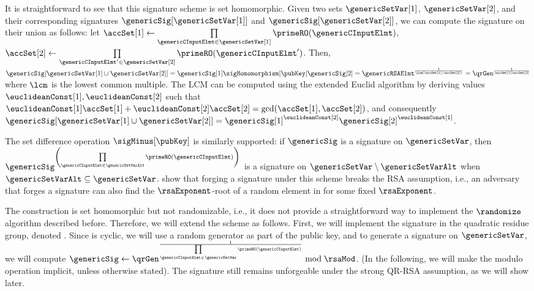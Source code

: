 It is straightforward to see that this signature 
scheme is set homomorphic. Given two sets $\genericSetVar[1]$, $\genericSetVar[2]$, and their 
corresponding signatures 
$\genericSig[\genericSetVar[1]]$ 
and $\genericSig[\genericSetVar[2]]$, we can compute the signature on their union as follows: let 
$\accSet[1] \gets 
\prod\limits_{\genericCInputElmt \in \genericSetVar[1]} \primeRO(\genericCInputElmt)$, $\accSet[2] \gets 
\prod\limits_{\genericCInputElmt' \in \genericSetVar[2]}  \primeRO(\genericCInputElmt')$. Then,  
$\genericSig[\genericSetVar[1] \cup \genericSetVar[2]] = \genericSig[1] 
\sigHomomorphism[\pubKey] \genericSig[2] = \genericRSAElmt^{\frac{1}{\lcm(\accSet[1],\accSet[2])}} 
= \qrGen^{\frac{1}{\accSet[1] \accSet[2]}}$ where $\lcm$ is the lowest common 
multiple. The LCM can be computed using the extended Euclid algorithm 
by deriving values $\euclideanConst[1], \euclideanConst[2]$ such that  
	$\euclideanConst[1]\accSet[1] + \euclideanConst[2] \accSet[2] = \gcd(\accSet[1], \accSet[2])$, and 
	consequently $\genericSig[\genericSetVar[1] \cup \genericSetVar[2]]  = 
	\genericSig[1]^{\euclideanConst[2]}  \genericSig[2]^{\euclideanConst[1]}$. 
	
	
	The set difference operation $\sigMinus[\pubKey]$ is similarly supported: 
	if $\genericSig$ is a signature on $\genericSetVar$, then 
	$\genericSig^{\left(\prod\limits_{\genericCInputElmt \in \genericSetVarAlt} 
	\primeRO(\genericCInputElmt)\right)}$ is a signature on $\genericSetVar \setminus 
		\genericSetVarAlt$ when $\genericSetVarAlt \subseteq \genericSetVar$. 
	\citet{johnson2002homomorphic} show that forging a signature 
	under this scheme breaks the RSA assumption, i.e., an adversary that forges a signature 
	can also find the $\rsaExponent$-root of a random element in \integersModNInv for some fixed 
	$\rsaExponent$. 
       \fi 
        

\newcommand{\equivClass}[2]{\ensuremath{\left\lbrack#1\right\rbrack_{#2}}\xspace}

\iffalse
{}
%
The construction is set homomorphic but not randomizable, 
i.e., it does not provide a straightforward way to implement the $\randomize$ algorithm described before. 
Therefore, we will extend the scheme as follows. First, we will implement the signature in the quadratic residue group, denoted \qrGroup. Since \qrGroup is cyclic, 
we will use a random generator 
\qrGen as part of the public key, and to generate a signature on $\genericSetVar$, we will compute 
$\genericSig \gets \qrGen^{\frac{1}{\prod\limits_{\genericCInputElmt \in 
\genericSetVar}\primeRO(\genericCInputElmt)}} \bmod \rsaMod$. (In the following, we 
will make the modulo operation implicit, unless otherwise stated). 
The signature still remains unforgeable under the strong 
QR-RSA assumption, as we will show later. 

